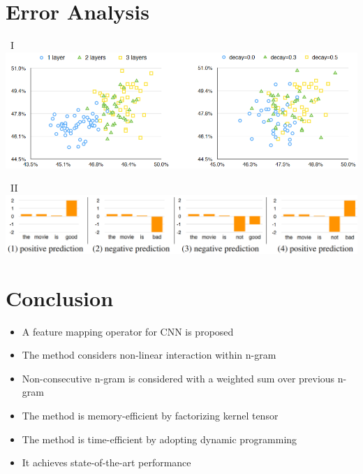 \documentclass[compress]{beamer}
\begin{document}
\section{Error Analysis}
    \begin{frame}{\secname\ I}
        \includegraphics[width=\textwidth]{error_analysis.png}
    \end{frame}
    \begin{frame}{\secname\ II}
        \includegraphics[width=\textwidth]{error_analysis2.png}
    \end{frame}

\section{Conclusion}
    \begin{frame}{\secname}
        \begin{itemize}
            \item A feature mapping operator for CNN is proposed
            \item The method considers non-linear interaction within n-gram
            \item Non-consecutive n-gram is considered with a weighted sum over previous n-gram
            \item The method is memory-efficient by factorizing kernel tensor
            \item The method is time-efficient by adopting dynamic programming
            \item It achieves state-of-the-art performance
        \end{itemize}
    \end{frame}
\end{document}
